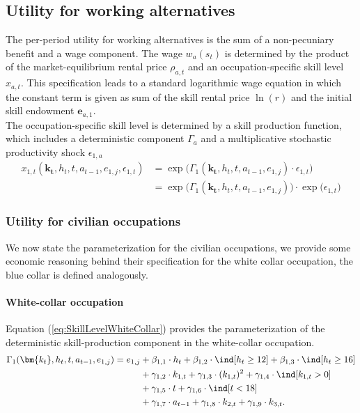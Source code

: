 \subsection{Utility for working alternatives}
The per-period utility for working alternatives is the sum of a non-pecuniary benefit and a wage component. The wage $w_{a}(s_t)$ is determined by the product of the market-equilibrium rental price $\rho_{a,t}$ and an occupation-specific skill level $x_{a,t}$. This specification leads to a standard logarithmic wage equation in which the constant term is given as sum of the skill rental price $\ln(r)$ and the initial skill endowment $\bm{e}_{a,1}$.\\

The occupation-specific skill level is determined by a skill production function, which includes a deterministic component $\Gamma_a$ and a multiplicative stochastic productivity shock $\epsilon_{1,a}$
%
\begin{align}\label{eq:WhiteCollarSkillLevel}
    x_{1,t}(\bm{k_t}, h_t, t, a_{t-1}, e_{1,j}, \epsilon_{1,t}) & = \exp \big( \Gamma_{1}(\bm{k_t},  h_t, t, a_{t-1}, e_{1,j}) \cdot \epsilon_{1,t} \big) \\\nonumber
                & = \exp \big( \Gamma_1(\bm{k_t},  h_t, t, a_{t-1}, e_{1,j}) \big) \cdot \exp \big( \epsilon_{1,t} \big)
\end{align}
\subsubsection{Utility for civilian occupations}
We now state the parameterization for the civilian occupations, we provide some economic reasoning behind their specification for the white collar occupation, the blue collar is defined analogously.

\paragraph{White-collar occupation} Equation (\ref{eq:SkillLevelWhiteCollar}) provides the parameterization of the deterministic skill-production component in the white-collar occupation.
%
\begin{align}\label{eq:SkillLevelWhiteCollar}
    \Gamma_1(\bm{k_t}, h_t, t, a_{t-1}, e_{1,j}) = e_{1,j} & + \beta_{1,1} \cdot h_t + \beta_{1, 2} \cdot \ind[h_t \geq 12] + \beta_{1,3} \cdot \ind[h_t\geq 16] \nonumber\\
                                 \nonumber & + \gamma_{1, 2} \cdot  k_{1,t} + \gamma_{1,3} \cdot  (k_{1,t})^2 + \gamma_{1,4} \cdot  \ind[k_{1,t} > 0] \\
                                  \nonumber & + \gamma_{1,5} \cdot  t + \gamma_{1,6} \cdot \ind[t < 18] \nonumber\\
                                  & + \gamma_{1,7} \cdot  a_{t-1} + \gamma_{1,8} \cdot  k_{2,t} + \gamma_{1,9} \cdot  k_{3,t}.
\end{align}
%

